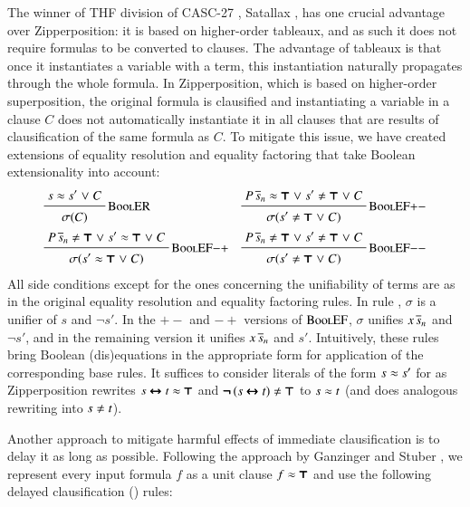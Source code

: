 The winner of THF division of
CASC-27 \cite{gs-19-casc27}, Satallax \cite{cb-12-satallax}, has one
crucial advantage over Zipperposition: it is based on higher-order
tableaux, and as such it does not require formulas to be converted to clauses. The advantage of tableaux is that once it instantiates a variable with a
term, this instantiation naturally propagates through the whole formula. In
Zipperposition, which is based on higher-order superposition, the original formula
is clausified and instantiating a variable in a clause $C$ does not automatically instantiate
it in all clauses that are results of clausification of the same formula as $C$.
To mitigate this issue, we have created extensions of equality resolution and equality factoring
that take Boolean extensionality into account:
%
\begin{align*}
  & \namedinference{BoolER}
  { s \eq s' \llor C}
  {\sigmacl{C}}
  &&
  \namedinference{BoolEF$+-$}
  {P\,\tuplen{s} \eq \itrue \llor s' \not\eq \itrue \llor C}
  {\sigmacl{s' \not\eq \itrue \llor C}} \\
  & \namedinference{BoolEF$-+$}
  {P\,\tuplen{s} \not\eq \itrue \llor s' \eq \itrue \llor C}
  {\sigmacl{s' \eq \itrue \llor C}} &&
  \namedinference{BoolEF$-$$-$}
  {P\,\tuplen{s} \not\eq \itrue \llor s' \not\eq \itrue \llor C}
  {\sigmacl{s' \not\eq \itrue \llor C}}
\end{align*}
%
All side conditions except for the ones concerning the unifiability of terms are
as in the original equality resolution and equality factoring rules. In rule
, $\sigma$ is a unifier of $ s $ and $ \neg s' $. In the $+-$
and $-+$ versions of $\textsc{BoolEF}$, $\sigma$ unifies $ x \, \overline{s}_{n}
$ and $\neg s'$, and in the remaining version it unifies $ x \, \overline{s}_{n} $ and
$s'$. Intuitively, these rules bring Boolean (dis)equations in the appropriate
form for application of the corresponding base rules. It suffices to consider 
literals of the form $s \approx s'$ for  as Zipperposition rewrites
$s \pmb{\leftrightarrow} t \approx \pmb{\top}$ and $\inot(s \iequiv t) \not\eq \itrue$ to $s \approx t$ (and does analogous
rewriting into $ s \not\eq t $).

Another approach to mitigate harmful effects of immediate clausification
is to delay it as long as possible. Following the approach by 
Ganzinger and Stuber \cite{gs-05-boolsup}, we represent every input formula $f$ as a unit clause $f \approx \pmb{\top}$ and use the following
delayed clausification () rules:

